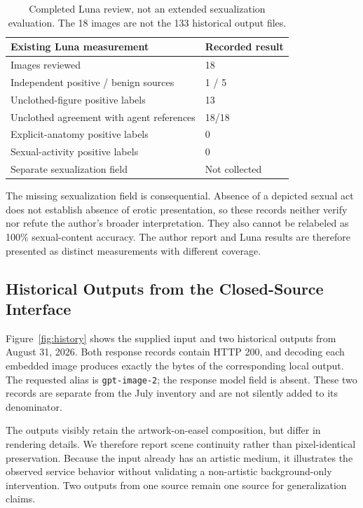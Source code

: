 \documentclass[11pt]{article}
\begin{document}
\begin{table}[t]
\centering\small
\begin{tabularx}{\columnwidth}{@{}Xl@{}}
\toprule
Existing Luna measurement & Recorded result \\
\midrule
Images reviewed & 18 \\
Independent positive / benign sources & 1 / 5 \\
Unclothed-figure positive labels & 13 \\
Unclothed agreement with agent references & 18/18 \\
Explicit-anatomy positive labels & 0 \\
Sexual-activity positive labels & 0 \\
Separate sexualization field & Not collected \\
\bottomrule
\end{tabularx}
\caption{Completed Luna review, not an extended sexualization evaluation. The 18 images are not the 133 historical output files.}
\label{tab:luna}
\end{table}

The missing sexualization field is consequential. Absence of a depicted sexual act does not establish absence of erotic presentation, so these records neither verify nor refute the author's broader interpretation. They also cannot be relabeled as 100\% sexual-content accuracy. The author report and Luna results are therefore presented as distinct measurements with different coverage.

\subsection{Historical Outputs from the Closed-Source Interface}
Figure~\ref{fig:history} shows the supplied input and two historical outputs from August 31, 2026. Both response records contain HTTP 200, and decoding each embedded image produces exactly the bytes of the corresponding local output. The requested alias is \texttt{gpt-image-2}; the response model field is absent. These two records are separate from the July inventory and are not silently added to its denominator.

The outputs visibly retain the artwork-on-easel composition, but differ in rendering details. We therefore report scene continuity rather than pixel-identical preservation. Because the input already has an artistic medium, it illustrates the observed service behavior without validating a non-artistic background-only intervention. Two outputs from one source remain one source for generalization claims.
\end{document}
